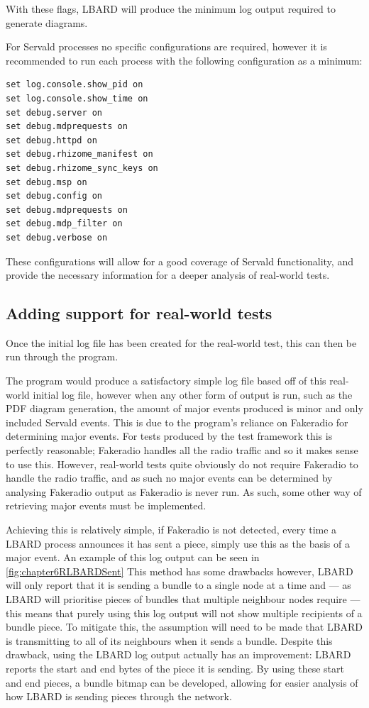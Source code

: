 With these flags, LBARD will produce the minimum log output required to generate diagrams. 

For Servald processes no specific configurations are required, however it is recommended to run each process with the following configuration as a minimum:
\begin{lstlisting}
set log.console.show_pid on 
set log.console.show_time on 
set debug.server on 
set debug.mdprequests on 
set debug.httpd on 
set debug.rhizome_manifest on
set debug.rhizome_sync_keys on
set debug.msp on
set debug.config on
set debug.mdprequests on
set debug.mdp_filter on
set debug.verbose on
\end{lstlisting}
These configurations will allow for a good coverage of Servald functionality, and provide the necessary information for a deeper analysis of real-world tests.


\subsection{Adding support for real-world tests}
Once the initial log file has been created for the real-world test, this can then be run through the program. 

The program would produce a satisfactory simple log file based off of this real-world initial log file, however when any other form of output is run, such as the PDF diagram generation, the amount of major events produced is minor and only included Servald events.
This is due to the program's reliance on Fakeradio for determining major events.
For tests produced by the test framework this is perfectly reasonable; Fakeradio handles all the radio traffic and so it makes sense to use this.
However, real-world tests quite obviously do not require Fakeradio to handle the radio traffic, and as such no major events can be determined by analysing Fakeradio output as Fakeradio is never run.
As such, some other way of retrieving major events must be implemented.

Achieving this is relatively simple, if Fakeradio is not detected, every time a LBARD process announces it has sent a piece, simply use this as the basis of a major event.
An example of this log output can be seen in \figurename{ \ref{fig:chapter6RLBARDSent}}
This method has some drawbacks however, LBARD will only report that it is sending a bundle to a single node at a time and — as LBARD will prioritise pieces of bundles that multiple neighbour nodes require — this means that purely using this log output will not show multiple recipients of a bundle piece.
To mitigate this, the assumption will need to be made that LBARD is transmitting to all of its neighbours when it sends a bundle.
Despite this drawback, using the LBARD log output actually has an improvement: LBARD reports the start and end bytes of the piece it is sending.
By using these start and end pieces, a bundle bitmap can be developed, allowing for easier analysis of how LBARD is sending pieces through the network.

